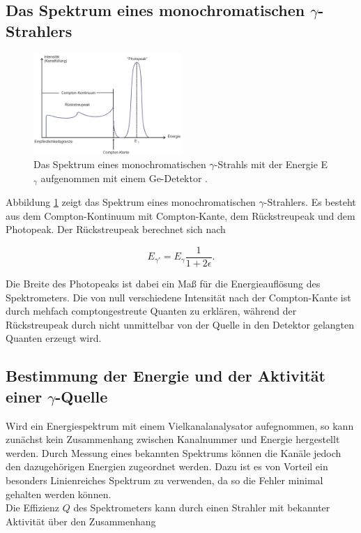 \FloatBarrier

\subsection{Das Spektrum eines monochromatischen $\gamma$-Strahlers} %
\label{sub:das_von_einem_ge_detektor_erzeugt_spektrum_eines_monochromatischen_gamma_strahlers}

\begin{figure}
	\centering
	\includegraphics[width = 0.5\textwidth]{pic/spek.png}
	\caption{Das Spektrum eines monochromatischen $\gamma$-Strahls mit der Energie E$_\gamma$ aufgenommen mit einem Ge-Detektor \cite{anleitung}.}
	\label{spek}
\end{figure}

Abbildung \ref{spek} zeigt das Spektrum eines monochromatischen $\gamma$-Strahlers.
Es besteht aus dem Compton-Kontinuum mit Compton-Kante, dem Rückstreupeak und dem Photopeak.
Der Rückstreupeak berechnet sich nach 

\begin{equation}
	E_{\gamma'} = E_\gamma \frac{1}{1+2\epsilon} \label{eqn:rueckstreu_peak}.
\end{equation}

Die Breite des Photopeaks ist dabei ein Maß für die Energieauflösung des Spektrometers.
Die von null verschiedene Intensität nach der Compton-Kante ist durch mehfach comptongestreute Quanten zu erklären,
während der Rückstreupeak durch nicht unmittelbar von der Quelle in den Detektor gelangten Quanten erzeugt wird.
\FloatBarrier
\subsection{Bestimmung der Energie und der Aktivität einer $\gamma$-Quelle} %
\label{sub:bestimmung_der_energie_und_der_aktivität_einer_gamma_quelle}

Wird ein Energiespektrum mit einem Vielkanalanalysator aufegnommen, so kann zunächst kein Zusammenhang zwischen Kanalnummer und Energie hergestellt werden.
Durch Messung eines bekannten Spektrums können die Kanäle jedoch den dazugehörigen Energien zugeordnet werden.
Dazu ist es von Vorteil ein besonders Linienreiches Spektrum zu verwenden, da so die Fehler minimal gehalten werden können.
\\
Die Effizienz $Q$ des Spektrometers kann durch einen Strahler mit bekannter Aktivität über den Zusammenhang

